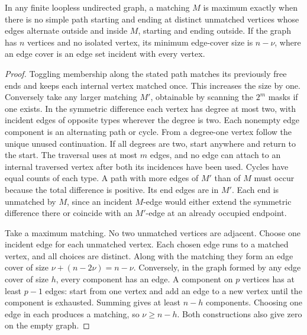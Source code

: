 \begin{theorem}\leavevmode\label{fl:berge}
In any finite loopless undirected graph, a matching $M$ is maximum
exactly when there is no simple path starting and ending at distinct
unmatched vertices whose edges alternate outside and inside $M$,
starting and ending outside. If the graph has $n$ vertices and no
isolated vertex, its minimum edge-cover size is $n-\nu$, where an
edge cover is an edge set incident with every vertex.
\end{theorem}
\begin{proof}
Toggling membership along the stated path matches its previously
free ends and keeps each internal vertex matched once. This increases
the size by one. Conversely take any larger matching $M'$, obtainable
by scanning the $2^m$ masks if one exists. In the symmetric difference
each vertex has degree at most two, with incident edges of opposite
types wherever the degree is two. Each nonempty edge component is an
alternating path or cycle. From a degree-one vertex follow the
unique unused continuation. If all degrees are two, start anywhere
and return to the start. The traversal uses at most $m$
edges, and no edge can attach to an internal traversed vertex after
both its incidences have been used. Cycles have equal counts of each
type. A path with more edges of $M'$ than of $M$ must occur because
the total difference is positive. Its end edges are in $M'$.
Each end is unmatched by $M$, since an incident $M$-edge would
either extend the symmetric difference there or coincide with an
$M'$-edge at an already occupied endpoint.

Take a maximum matching. No two unmatched vertices are adjacent.
Choose one incident edge for each unmatched vertex. Each chosen edge
runs to a matched vertex, and all choices are distinct. Along with
the matching they form an edge cover of size $\nu+(n-2\nu)=n-\nu$.
Conversely, in the graph formed by any edge cover of size $h$, every
component has an edge. A component on $p$ vertices has at least $p-1$
edges: start from one vertex and add an edge to a new vertex until
the component is exhausted. Summing gives at least $n-h$ components.
Choosing one edge in each produces a matching, so $\nu\ge n-h$.
Both constructions also give zero on the empty graph.
\end{proof}

